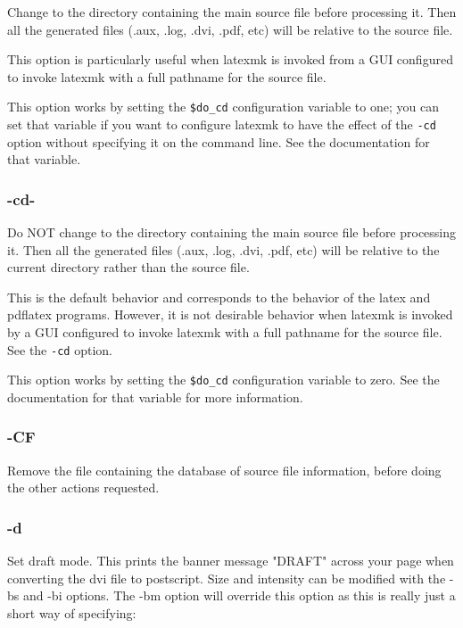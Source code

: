 Change to the directory containing the main source  file  before processing
it.  Then all the generated files (.aux, .log, .dvi, .pdf, etc) will be
relative to the source file.

This option is particularly useful when latexmk is invoked  from
a  GUI configured to invoke latexmk with a full pathname for the
source file.

This option works by setting the \verb|$do_cd|  configuration  variable to
one;  you can set that variable if you want to configure latexmk to have the
effect of the \verb|-cd| option without specifying it on the command line.  See the
documentation for that variable.

\subsubsection{-cd-}

Do  NOT  change to the directory containing the main source file before
processing it.  Then all the generated files (.aux, .log, .dvi,  .pdf,  etc)
will  be  relative  to the current directory rather than the source file.

This is the default behavior and corresponds to the behavior  of
the  latex  and pdflatex programs.  However, it is not desirable
behavior when latexmk is invoked by a GUI configured  to  invoke
latexmk  with  a full pathname for the source file.  See the \verb|-cd|
option.

This option works by setting the \verb|$do_cd|  configuration  variable to
zero.   See the documentation for that variable for more information.

\subsubsection{-CF}

Remove the file containing the database of source file  information,
before doing the other actions requested.


\subsubsection{-d}

Set  draft  mode.  This prints the banner message "DRAFT" across
your page when converting the dvi file to postscript.  Size  and
intensity can be modified with the -bs and -bi options.  The -bm
option will override this option as this is really just a  short
way of specifying:

